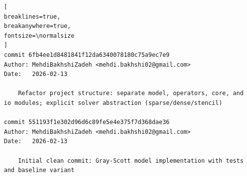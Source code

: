 \begin{Verbatim}[
breaklines=true,
breakanywhere=true,
fontsize=\normalsize
]
commit 6fb4ee1d8481841f12da6340078180c75a9ec7e9
Author: MehdiBakhshiZadeh <mehdi.bakhshi02@gmail.com>
Date:   2026-02-13

    Refactor project structure: separate model, operators, core, and io modules; explicit solver abstraction (sparse/dense/stencil)

commit 551193f1e302d96d6c89fe5e4e375f7d368dae36
Author: MehdiBakhshiZadeh <mehdi.bakhshi02@gmail.com>
Date:   2026-02-13

    Initial clean commit: Gray-Scott model implementation with tests and baseline variant
\end{Verbatim}